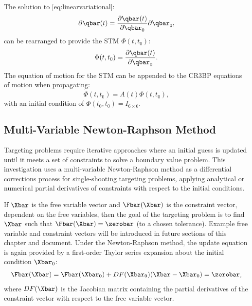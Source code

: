 The solution to \cref{eq:linearvariational}:
\begin{equation}
    \partial\qbar(t)=\frac{\partial\qbar(t)}{\partial\qbar_{0}}\partial\qbar_{0},
    \label{eq:variationalsolution}
\end{equation}
can be rearranged to provide the STM $\Phi(t,t_{0})$:
\begin{equation}
    \Phi(t,t_{0})=\frac{\partial\qbar(t)}{\partial\qbar_{{0}}}.
    \label{eq:STM}
\end{equation}
The equation of motion for the STM can be appended to the CR3BP equations of motion when
propagating:
\begin{equation}
    \dot{\Phi}(t,t_{0})=A(t)\Phi(t,t_{0}),
    \label{eq:STMEoM}
\end{equation}
with an initial condition of $\Phi(t_{0},t_{0})=I_{6\times6}$.

\subsection{Multi-Variable Newton-Raphson Method}
Targeting problems require iterative approaches where an initial guess is updated until it meets a
set of constraints to solve a boundary value problem. This investigation uses a multi-variable
Newton-Raphson method as a differential corrections process for single-shooting targeting problems,
applying analytical or numerical partial derivatives of constraints with respect to the initial
conditions.

If $\Xbar$ is the free variable vector and $\Fbar(\Xbar)$ is the constraint vector, dependent on
the free variables, then the goal of the targeting problem is to find $\Xbar$ such that
$\Fbar(\Xbar)=\zerobar$ (to a chosen tolerance). Example free variable and constraint vectors will
be introduced in future sections of this chapter and document. Under the Newton-Raphson method, the
update equation is again provided by a first-order Taylor series expansion about the initial
condition $\Xbar_{0}$:
\begin{equation}
    \Fbar(\Xbar)=\Fbar(\Xbar_{0})+DF(\Xbar_{0})(\Xbar-\Xbar_{0})=\zerobar,
    \label{eq:updateequation}
\end{equation}
where $DF(\Xbar)$ is the Jacobian matrix containing the partial derivatives of the constraint
vector with respect to the free variable vector.


